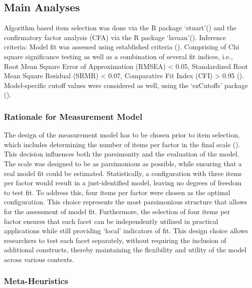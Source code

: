 \documentclass[
  12pt,
  a4paper,
  twoside]{article}
\begin{document}
\subsection{Main Analyses}\label{main-analyses}

Algorithm based item selection was done via the R package `stuart'() and the confirmatory factor analysis (CFA) via the R package `lavaan'(). Inference criteria: Model fit was assessed using established criteria (). Comprising of Chi square significance testing as well as a combination of several fit indices, i.e., Root Mean Square Error of Approximation (RMSEA) \textless{} 0.05, Standardized Root Mean Square Residual (SRMR) \textless{} 0.07, Comparative Fit Index (CFI) \textgreater{} 0.95 (). Model-specific cutoff values were considered as well, using the `ezCutoffs' package ().

\subsubsection{Rationale for Measurement Model}\label{rationale-for-measurement-model}

The design of the measurement model has to be chosen prior to item selection, which includes determining the number of items per factor in the final scale (). This decision influences both the parsimonity and the evaluation of the model. The scale was designed to be as parsimonious as possible, while ensuring that a real model fit could be estimated. Statistically, a configuration with three items per factor would result in a just-identified model, leaving no degrees of freedom to test fit. To address this, four items per factor were chosen as the optimal configuration. This choice represents the most parsimonious structure that allows for the assessment of model fit.
Furthermore, the selection of four items per factor ensures that each facet can be independently utilized in practical applications while still providing `local' indicators of fit. This design choice allows researchers to test each facet separately, without requiring the inclusion of additional constructs, thereby maintaining the flexibility and utility of the model across various contexts.

\subsubsection{Meta-Heuristics}\label{meta-heuristics}
\end{document}
